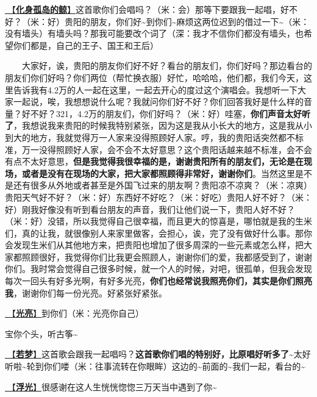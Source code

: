 \documentclass[]{ctexbook}
\begin{document}
\hyperref[hua-shen-gu-dao-de-jing]{🎵【\textbf{化身孤岛的鲸}】}这首歌你们会唱吗？（米：会）那等下要跟我一起唱，好不好？（米：好）贵阳的朋友，你们好\textasciitilde 到你们\textasciitilde 麻烦这两位迟到的借过一下\textasciitilde（米：没有墙头）有墙头吗？那我可能要改个词了（深：我才不信你们都没有墙头，也希望你们都是，自己的王子、国王和王后）

  大家好，诶，贵阳的朋友你们好不好？看台的朋友们，你们好吗？那边看台的朋友们你们好吗？你们两位（帮忙换衣服）好忙，哈哈哈，他们都，我们今天，这里告诉我有4.2万的人一起在这里，一起去开心的度过这个演唱会。我想听一下大家一起说，唉，我想想说什么呢？我就问你们好不好？你们回答我好是什么样的音量？好不好？321，4.2万的朋友们，你们好吗？（米：好）哇塞，\textbf{你们声音太好听了}，我想说我来贵阳的时候我特别紧张，因为这是我从小长大的地方，这是我从小到大的地方，我就觉得万一人家来没得照顾好人家。哼，我的贵阳话突然都不标准，万一没得照顾好人家，会不会不太好意思？这个贵阳话越来越不标准，会不会有点不太好意思，\textbf{但是我觉得我很幸福的是，谢谢贵阳所有的朋友们，无论是在现场，或者是没有在现场的大家，把大家都照顾得非常好，谢谢你们}。当然这里是不是还有很多从外地或者甚至是外国飞过来的朋友啊？贵阳凉不凉爽？（米：凉爽）贵阳天气好不好？（米：好）东西好不好吃？（米：好吃）贵阳人好不好？（米：好）刚我好像没有听到看台朋友的声音，我们让他们说一下，贵阳人好不好？（米：好）没错，所以我觉得自己很幸福，而且更大的惊喜是，哪怕就是我的生米们，真的让我，就很像别人来家里做客，会担心，诶，完了没有做好什么事。那你会发现生米们从其他地方来，把贵阳也增加了很多周深的一些元素或怎么样，把大家都照顾很好，我觉得你们比我更会照顾人，谢谢你们的爱，我都感受到了，谢谢你们。我时常会觉得自己很多时候，就一个人的时候，对吧，很孤单，但我会发现每次一回头有好多光啊，有好多光亮，\textbf{你们也经常说我照亮你们，其实是你们照亮我}，谢谢你们每一份光亮。好紧张好紧张。

\hyperref[silver-linings]{🎵【\textbf{光亮}】}到你们（米：光亮你自己）

宝你个头，听古筝\textasciitilde{}

\hyperref[ruomeng]{🎵【\textbf{若梦}】}这首歌会跟我一起唱吗？\textbf{这首歌你们唱的特别好，比原唱好听多了\textasciitilde{}}太好听啦\textasciitilde 轮到你们喽（米：往事流转在你眼眸）这边的\textasciitilde 前面的\textasciitilde 我们一起，看台的\textasciitilde{}

\hyperref[floating-light]{🎵【\textbf{浮光}】}很感谢在这人生恍恍惚惚三万天当中遇到了你\textasciitilde{}
\end{document}
